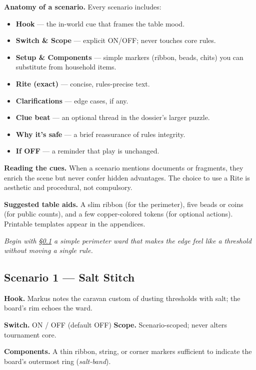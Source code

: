 \documentclass[11pt]{article}
\numberwithin{equation}{section} %
\theoremstyle{plain} %
\theoremstyle{definition} %
\theoremstyle{remark} %
\begin{document}
\medskip
\noindent\textbf{Anatomy of a scenario.} Every scenario includes:
\begin{itemize}\setlength\itemsep{0.3em}
  \item \textbf{Hook} --- the in-world cue that frames the table mood.
  \item \textbf{Switch \& Scope} --- explicit \textsc{ON/OFF}; never touches core rules.
  \item \textbf{Setup \& Components} --- simple markers (ribbon, beads, chits) you can substitute from household items.
  \item \textbf{Rite (exact)} --- concise, rules-precise text.
  \item \textbf{Clarifications} --- edge cases, if any.
  \item \textbf{Clue beat} --- an optional thread in the dossier's larger puzzle.
  \item \textbf{Why it's safe} --- a brief reassurance of rules integrity.
  \item \textbf{If \textsc{OFF}} --- a reminder that play is unchanged.
\end{itemize}

\medskip
\noindent\textbf{Reading the cues.} When a scenario mentions documents or fragments, they enrich the scene but never confer hidden advantages. The choice to use a Rite is aesthetic and procedural, not compulsory.

\medskip
\noindent\textbf{Suggested table aids.} A slim ribbon (for the perimeter), five beads or coins (for public counts), and a few copper-colored tokens (for optional actions). Printable templates appear in the appendices.

\medskip
\noindent\textit{Begin with \S\ref{scen:salt-stitch} \textemdash{} a simple perimeter ward that makes the edge feel like a threshold without moving a single rule.}

\subsection{Scenario 1 --- Salt Stitch}
\label{scen:salt-stitch}

\noindent\textbf{Hook.} Markus notes the caravan custom of dusting thresholds with salt; the board's rim echoes the ward.

\medskip
\noindent\textbf{Switch.} \textsc{ON / OFF} (default \textsc{OFF}) \hfill \textbf{Scope.} Scenario-scoped; never alters tournament core.

\medskip
\noindent\textbf{Components.} A thin ribbon, string, or corner markers sufficient to indicate the board's outermost ring (\emph{salt-band}).
\end{document}
